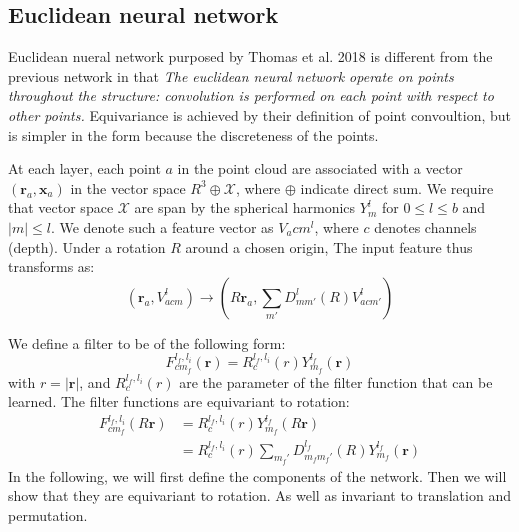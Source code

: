 \documentclass{IEEEtran}
\begin{document}
\subsection*{Euclidean neural network}

Euclidean nueral network purposed by Thomas et al. 2018\cite{thomas_tensor_2018} is different from the previous network in that
\emph{The euclidean neural network operate on points throughout the structure: convolution is performed on each point with respect to other points.}
Equivariance is achieved by their definition of point convoultion, but is simpler in the form because the discreteness of the 
points.

At each layer, each point $a$ in the point cloud are associated with a vector $(\mathbf{r}_a, \mathbf{x}_a)$ 
in the vector space $R^3 \oplus \mathcal{X}$, where $\oplus$ indicate direct sum. We require that vector space $\mathcal{X}$ are span 
by the spherical harmonics $Y_m^l$ for $0\leq l \leq b$ and $|m|\leq l$. We denote such a feature 
vector as $V_acm^l$, where $c$ denotes channels (depth). 
Under a rotation $R$ around a chosen origin, The input feature thus transforms as:
\begin{equation}
    (\mathbf{r}_{a}, V_{acm}^l) \to (R \mathbf{r}_{a}, \sum_{m'}D_{mm'}^l(R)V_{acm'}^l) \label{E:3dnn_rotation_input}
\end{equation}

We define a filter to be of the following form:
\begin{equation}
    F_{cm_f}^{l_f, l_i}(\mathbf{r}) =  R_c^{l_f, l_i} (r) Y_{m_f}^{l_f}(\mathbf{r})
\end{equation}
with $r = |\mathbf{r}|$, and $R_c^{l_f, l_i} (r)$ are the parameter of the filter function that can be learned.
The filter functions are equivariant to rotation:
\begin{align}
    F_{cm_f}^{l_f, l_i}(R\mathbf{r}) &= R_c^{l_f, l_i} (r) Y_{m_f}^{l_f}(R\mathbf{r}) \\
    &= R_c^{l_f, l_i} (r) \sum_{m_f'} D_{m_fm_f'}^{l_f}(R)  Y_{m_f}^{l_f}(\mathbf{r})
\end{align}
In the following, we will first define the components of the network.
Then we will show that they are equivariant to rotation. As well as 
invariant to translation and permutation.
\end{document}
